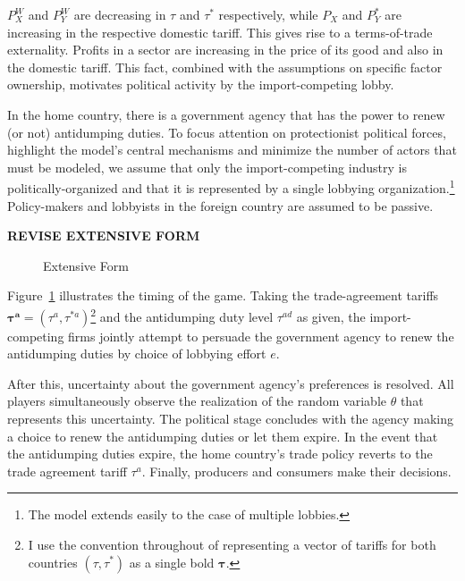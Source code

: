 \documentclass[10pt]{article}
\newcommand{\ta}{\theta}
\newcommand{\bta}{\bm{\tau^a}}
\newcommand{\tad}{\tau^{ad}}
\begin{document}
$P_X^W$ and $P_Y^W$ are decreasing in $\tau$ and $\tau^*$ respectively, while $P_X$ and $P_Y^*$ are increasing in the respective domestic tariff. This gives rise to a terms-of-trade externality. Profits in a sector are increasing in the price of its good and also in the domestic tariff. This fact, combined with the assumptions on specific factor ownership, motivates political activity by the import-competing lobby.

In the home country, there is a government agency that has the power to renew (or not) antidumping duties. To focus attention on protectionist political forces, highlight the model's central mechanisms and minimize the number of actors that must be modeled, we assume that only the import-competing industry is politically-organized and that it is represented by a single lobbying organization.\footnote{The model extends easily to the case of multiple lobbies.\label{fn:lobby}} Policy-makers and lobbyists in the foreign country are assumed to be passive.

\textbf{REVISE EXTENSIVE FORM}

\begin{figure}
	\begin{center}
		
	\end{center}
	\caption{Extensive Form\label{fig:ext}}
\end{figure}

Figure~\ref{fig:ext} illustrates the timing of the game. Taking the trade-agreement tariffs $\bta = \left(\tau^a,\tau^{*a}\right)$\footnote{I use the convention throughout of representing a vector of tariffs for both countries $(\tau,\tau^*)$ as a single bold $\bm{\tau}$.} and the antidumping duty level $\tad$ as given, the import-competing firms jointly attempt to persuade the government agency to renew the antidumping duties by choice of lobbying effort $e$. 

After this, uncertainty about the government agency's preferences is resolved. All players simultaneously observe the realization of the random variable $\ta$ that represents this uncertainty. The political stage concludes with the agency making a choice to renew the antidumping duties or let them expire. In the event that the antidumping duties expire, the home country's trade policy reverts to the trade agreement tariff $\tau^a$. Finally, producers and consumers make their decisions.
\end{document}
